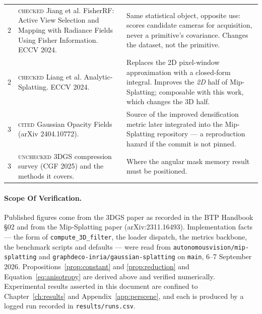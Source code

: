 \begin{table}[htbp]
\begin{tabularx}{\linewidth}{cL{0.90}L{1.10}}
    2 & \textsc{checked} Jiang et al. FisherRF: Active View Selection and Mapping with Radiance Fields Using Fisher Information. ECCV 2024. & Same statistical object, opposite use: scores candidate cameras for acquisition, never a primitive's covariance. Changes the dataset, not the primitive. \\
    2 & \textsc{checked} Liang et al. Analytic-Splatting. ECCV 2024. & Replaces the 2D pixel-window approximation with a closed-form integral. Improves the \emph{2D} half of Mip-Splatting; composable with this work, which changes the 3D half. \\
    3 & \textsc{cited} Gaussian Opacity Fields (arXiv 2404.10772). & Source of the improved densification metric later integrated into the Mip-Splatting repository --- a reproduction hazard if the commit is not pinned. \\
    3 & \textsc{unchecked} 3DGS compression survey (CGF 2025) and the methods it covers. & Where the angular mask memory result must be positioned. \\
    \bottomrule
  \end{tabularx}
\end{table}

\paragraph{Scope Of Verification.} Published figures come from the 3DGS paper as
recorded in the BTP Handbook \S02 and from the Mip-Splatting paper
(arXiv:2311.16493). Implementation facts --- the form of
\texttt{compute\_3D\_filter}, the loader dispatch, the metrics backbone, the
benchmark scripts and defaults --- were read from
\texttt{autonomousvision/mip-splatting} and
\texttt{graphdeco-inria/gaussian-splatting} on \texttt{main}, 6--7 September
2026. Propositions~\ref{prop:constant} and \ref{prop:reduction} and
Equation~\eqref{eq:anisotropy} are derived above and verified numerically.
Experimental results asserted in this document are confined to
Chapter~\ref{ch:results} and Appendix~\ref{app:perscene}, and each is produced by
a logged run recorded in \texttt{results/runs.csv}.

